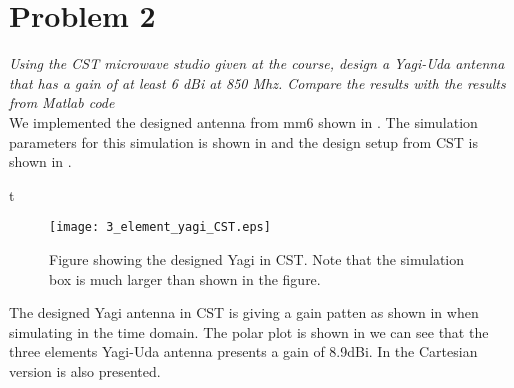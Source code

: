\section{Problem 2} \label{sec:CST_implimented_Yagi}
\textit{ Using the CST microwave studio given at the course, design a Yagi-Uda antenna that has a gain of at least 6 dBi at 850 Mhz. Compare the results with the results from Matlab code }\\

We implemented the designed antenna from mm6 shown in . The simulation parameters for this simulation is shown in  and the design setup from CST is shown in \figref{}.

t 
\begin{figure}[!h]
  \centering
  \texttt{[image: 3\_element\_yagi\_CST.eps]}
  \caption{Figure showing the designed Yagi in CST. Note that the simulation box is much larger than shown in the figure.}
  \label{fig:3_element_yagi-uda_geometry}
\end{figure}

The designed Yagi antenna in CST is giving a gain patten as shown in  when simulating in the time domain. The polar plot is shown in  we can see that the three elements Yagi-Uda antenna presents a gain of 8.9dBi. In  the Cartesian version is also presented.

